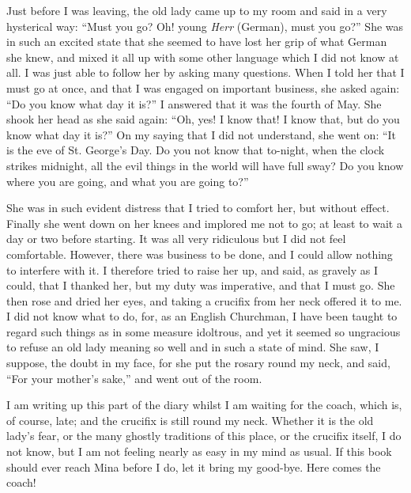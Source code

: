 \documentclass{article}
\begin{document}
				Just before I was leaving, the old lady came up to my room and said in a very hysterical way: “Must you go? Oh! young \textit{Herr} (German), must you go?” She was in such an excited state that she seemed to have lost her grip of what German she knew, and mixed it all up with some other language which I did not know at all. I was just able to follow her by asking many questions. When I told her that I must go at once, and that I was engaged on important business, she asked again: “Do you know what day it is?” I answered that it was the fourth of May. She shook her head as she said again: “Oh, yes! I know that! I know that, but do you know what day it is?” On my saying that I did not understand, she went on: “It is the eve of St. George’s Day. Do you not know that to-night, when the clock strikes midnight, all the evil things in the world will have full sway? Do you know where you are going, and what you are going to?”\par\bigskip
				
				She was in such evident distress that I tried to comfort her, but without effect. Finally she went down on her knees and implored me not to go; at least to wait a day or two before starting. It was all very ridiculous but I did not feel comfortable. However, there was business to be done, and I could allow nothing to interfere with it. I therefore tried to raise her up, and said, as gravely as I could, that I thanked her, but my duty was imperative, and that I must go. She then rose and dried her eyes, and taking a crucifix from her neck offered it to me. I did not know what to do, for, as an English Churchman, I have been taught to regard such things as in some measure idoltrous, and yet it seemed so ungracious to refuse an old lady meaning so well and in such a state of mind. She saw, I suppose, the doubt in my face, for she put the rosary round my neck, and said, “For your mother’s sake,” and went out of the room.\par\bigskip
				
				I am writing up this part of the diary whilst I am waiting for the coach, which is, of course, late; and the crucifix is still round my neck. Whether it is the old lady’s fear, or the many ghostly traditions of this place, or the crucifix itself, I do not know, but I am not feeling nearly as easy in my mind as usual. If this book should ever reach Mina before I do, let it bring my good-bye. Here comes the coach!\par\bigskip
			
			
		\par\vfill\clearpage 
			
\end{document}
